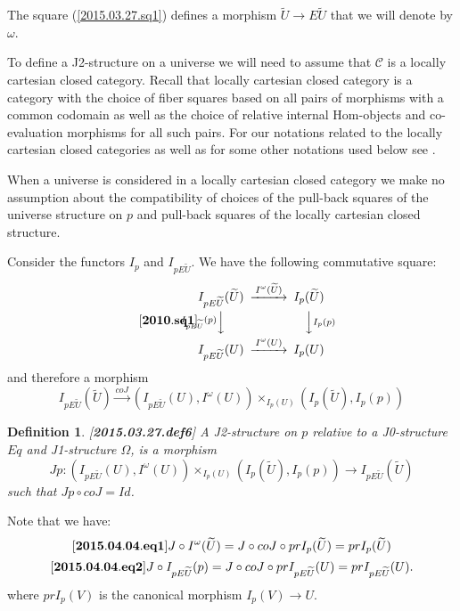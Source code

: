 \documentclass[12pt]{article}
\newenvironment{eq}{\begin{equation}}{\end{equation}}
\newtheorem{definition}[proposition]{Definition}
\newcommand{\llabel}[1]{\label{#1}[{\bf #1}]}
\newcommand{\sr}{\rightarrow}
\newcommand{\lr}{\longrightarrow}
\newcommand{\wt}{\widetilde}
\begin{document}
The square (\ref{2015.03.27.sq1}) defines a morphism $\wt{U}\sr E\wt{U}$ that we will denote by $\omega$. 



To define a J2-structure on a universe we will need to assume that $\mathcal C$ is a locally cartesian closed category.  Recall that locally cartesian closed category is a category with the choice of fiber squares based on all pairs of morphisms with a common codomain as well as the choice of relative internal Hom-objects and co-evaluation morphisms for all such pairs. For our notations related to the locally cartesian closed categories as well as for some other notations used below see \cite{fromunivwithPi}. 

When a universe is considered in a locally cartesian closed category we make no assumption about the compatibility of choices of the pull-back squares of the universe structure on $p$ and pull-back squares of the locally cartesian closed structure. 

Consider the functors $I_{p}$ and $I_{pE\wt{U}}$. We have the following commutative square:
%
\begin{eq}\llabel{2010.sq1}
\begin{CD}
I_{pE\wt{U}}(\wt{U}) @>I^{\omega}(\wt{U})>> I_p(\wt{U})\\
@VI_{pE\wt{U}}(p)VV @VVI_p(p)V\\
I_{pE\wt{U}}(U) @>I^{\omega}(U)>> I_p(U)
\end{CD}
\end{eq}
%
and therefore a morphism
%
$$I_{pE\wt{U}}(\wt{U}) \stackrel{coJ}{\lr}
(I_{pE\wt{U}}(U), I^{\omega}(U)) \times_{I_p(U)} (I_p(\wt{U}), I_p(p))
$$
%
\begin{definition}
\llabel{2015.03.27.def6}
A J2-structure on $p$ relative to a J0-structure $Eq$ and J1-structure $\Omega$, is a morphism 
%
$$
Jp:( I_{pE\wt{U}}(U), I^{\omega}(U))\times_{I_p(U)} (I_p(\wt{U}), I_p(p))\sr I_{pE\wt{U}}(\wt{U}) $$
%
such that $Jp\circ coJ = Id$.
\end{definition}
%
Note that we have:
%
\begin{eq}
\llabel{2015.04.04.eq1}
J\circ I^{\omega}(\wt{U})=J\circ coJ\circ prI_p(\wt{U})=prI_{p}(\wt{U})
\end{eq}
%
\begin{eq}
\llabel{2015.04.04.eq2}
J\circ I_{pE\wt{U}}(p)=J\circ coJ\circ prI_{pE\wt{U}}(U)=prI_{pE\wt{U}}(U).
\end{eq}
%
where $prI_p(V)$ is the canonical morphism $I_p(V)\sr U$.
\end{document}
